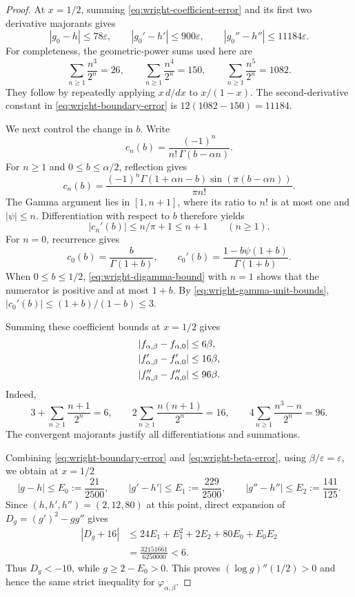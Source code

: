 \documentclass[11pt,a4paper]{article}
\theoremstyle{definition}
\theoremstyle{remark}
\numberwithin{equation}{section}
\begin{document}
\begin{proof}
At $x=1/2$, summing \eqref{eq:wright-coefficient-error} and its first
two derivative majorants gives
\begin{equation}
 |g_0-h|\leq78\varepsilon,\qquad
 |g_0'-h'|\leq900\varepsilon,\qquad
 |g_0''-h''|\leq11184\varepsilon.
 \label{eq:wright-boundary-error}
\end{equation}
For completeness, the geometric-power sums used here are
\[
 \sum_{n\geq1}\frac{n^3}{2^n}=26,\qquad
 \sum_{n\geq1}\frac{n^4}{2^n}=150,\qquad
 \sum_{n\geq1}\frac{n^5}{2^n}=1082.
\]
They follow by repeatedly applying $x\,d/dx$ to $x/(1-x)$.
The second-derivative constant in
\eqref{eq:wright-boundary-error} is
$12(1082-150)=11184$.

We next control the change in $b$. Write
\[
 c_n(b)=\frac{(-1)^n}{n!\,\Gamma(b-\alpha n)}.
\]
For $n\geq1$ and $0\leq b\leq\alpha/2$, reflection gives
\[
 c_n(b)=\frac{(-1)^n\Gamma(1+\alpha n-b)
                     \sin(\pi(b-\alpha n))}{\pi n!}.
\]
The Gamma argument lies in $[1,n+1]$, where its ratio to $n!$ is at
most one and $|\psi|\leq n$. Differentiation with respect to $b$
therefore yields
\begin{equation}
 |c_n'(b)|\leq n/\pi+1\leq n+1\qquad(n\geq1).
 \label{eq:wright-beta-coefficients}
\end{equation}
For $n=0$, recurrence gives
\[
 c_0(b)=\frac{b}{\Gamma(1+b)},\qquad
 c_0'(b)=\frac{1-b\psi(1+b)}{\Gamma(1+b)}.
\]
When $0\leq b\leq1/2$, \eqref{eq:wright-digamma-bound} with $n=1$
shows that the numerator is positive and at most $1+b$.
By \eqref{eq:wright-gamma-unit-bounds},
$|c_0'(b)|\leq(1+b)/(1-b)\leq3$.

Summing these coefficient bounds at $x=1/2$ gives
\begin{align}
 |f_{\alpha,\beta}-f_{\alpha,0}|&\leq6\beta,\notag\\
 |f_{\alpha,\beta}'-f_{\alpha,0}'|&\leq16\beta,\notag\\
 |f_{\alpha,\beta}''-f_{\alpha,0}''|&\leq96\beta.
 \label{eq:wright-beta-error}
\end{align}
Indeed,
\[
 3+\sum_{n\geq1}\frac{n+1}{2^n}=6,\qquad
 2\sum_{n\geq1}\frac{n(n+1)}{2^n}=16,\qquad
 4\sum_{n\geq1}\frac{n^3-n}{2^n}=96.
\]
The convergent majorants justify all differentiations and summations.

Combining \eqref{eq:wright-boundary-error} and
\eqref{eq:wright-beta-error}, using $\beta/\varepsilon=\varepsilon$,
we obtain at $x=1/2$
\[
 |g-h|\leq E_0:=\frac{21}{2500},\qquad
 |g'-h'|\leq E_1:=\frac{229}{2500},\qquad
 |g''-h''|\leq E_2:=\frac{141}{125}.
\]
Since $(h,h',h'')=(2,12,80)$ at this point, direct expansion of
$D_g=(g')^2-gg''$ gives
\begin{align*}
 |D_g+16|
 &\leq24E_1+E_1^2+2E_2+80E_0+E_0E_2\\
 &=\frac{32151661}{6250000}<6.
\end{align*}
Thus $D_g<-10$, while $g\geq2-E_0>0$. This proves
$(\log g)''(1/2)>0$ and hence the same strict inequality for
$\varphi_{\alpha,\beta}$.


\end{proof}
\end{document}

